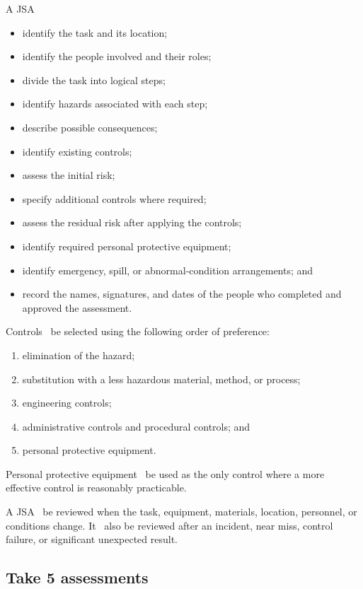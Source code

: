 A JSA \must\:
\begin{itemize}
    \item identify the task and its location;
    \item identify the people involved and their roles;
    \item divide the task into logical steps;
    \item identify hazards associated with each step;
    \item describe possible consequences;
    \item identify existing controls;
    \item assess the initial risk;
    \item specify additional controls where required;
    \item assess the residual risk after applying the controls;
    \item identify required personal protective equipment;
    \item identify emergency, spill, or abnormal-condition arrangements; and
    \item record the names, signatures, and dates of the people who completed and approved the assessment.
\end{itemize}

Controls \must~be selected using the following order of preference:
\begin{enumerate}
    \item elimination of the hazard;
    \item substitution with a less hazardous material, method, or process;
    \item engineering controls;
    \item administrative controls and procedural controls; and
    \item personal protective equipment.
\end{enumerate}

Personal protective equipment \mustnot~be used as the only control where a more effective control is reasonably practicable.

A JSA \must~be reviewed when the task, equipment, materials, location, personnel, or conditions change. It \must~also be reviewed after an incident, near miss, control failure, or significant unexpected result.




\subsection{Take 5 assessments}

